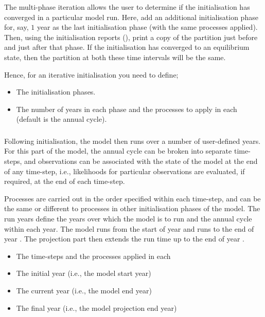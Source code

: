 The multi-phase iteration allows the user to determine if the initialisation has converged in a particular model run. Here, add an additional initialisation phase for, say, $1$ year as the last initialisation phase (with the same processes applied). Then, using the initialisation reports (), print a copy of the partition just before and just after that phase. If the initialisation has converged to an equilibrium state, then the partition at both these time intervals will be the same.

Hence, for an iterative initialisation you need to define;
\begin{itemize}
  \item The initialisation phases.
  \item The number of years in each phase and the processes to apply in each (default is the annual cycle).
\end{itemize}

\subsubsection{}

Following initialisation, the model then runs over a number of user-defined years. For this part of the model, the annual cycle can be broken into separate time-steps, and observations can be associated with the state of the model at the end of any time-step, i.e., likelihoods for particular observations are evaluated, if required, at the end of each time-step. 

Processes are carried out in the order specified within each time-step, and can be the same or different to processes in other initialisation phases of the model. The run years define the years over which the model is to run and the annual cycle within each year. The model runs from the start of year  and runs to the end of year . The projection part then extends the run time up to the end of year . 

\begin{itemize}
  \item The time-steps and the processes applied in each
  \item The initial year (i.e., the model start year)
  \item The current year (i.e., the model end year)
  \item The final year (i.e., the model projection end year)
\end{itemize}


